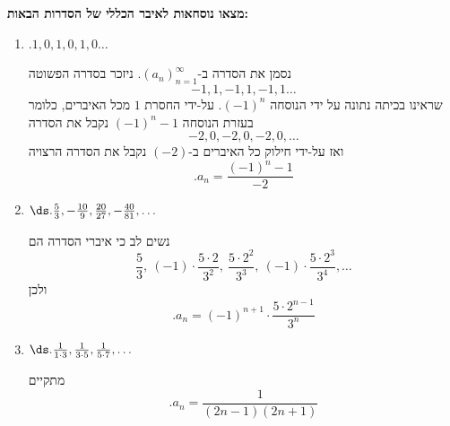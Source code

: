 \textbf{מצאו נוסחאות לאיבר הכללי של הסדרות הבאות:}
\begin{enumerate}
\item $.1,0,1,0,1,0\ldots$
\begin{solbox}
נסמן את הסדרה ב-$(a_n)_{n=1}^{\infty}$.
ניזכר בסדרה הפשוטה
$$-1,1,-1,1,-1,1\ldots$$
שראינו בכיתה נתונה על ידי הנוסחה
$(-1)^n$.
על-ידי החסרת
$1$
מכל האיברים, כלומר בעזרת הנוסחה
$(-1)^n-1$
נקבל את הסדרה
$$-2,0,-2,0,-2,0,\ldots$$
ואז על-ידי חילוק כל האיברים ב-$(-2)$
נקבל את הסדרה הרצויה
$$.a_n=\frac{(-1)^n-1}{-2}$$
\end{solbox}
\item $\ds .\frac53,-\frac{10}{9},\frac{20}{27},-\frac{40}{81},\ldots$
\begin{solbox}
נשים לב כי איברי הסדרה הם
$$\frac53,\ (-1)\cdot\frac{5\cdot2}{3^2},\ \frac{5\cdot2^2}{3^3},\ (-1)\cdot\frac{5\cdot2^3}{3^4},\ldots$$
ולכן
$$.a_n=(-1)^{n+1}\cdot\frac{5\cdot2^{n-1}}{3^n}$$
\end{solbox}
\item $\ds .\frac{1}{1\cdot3},\frac{1}{3\cdot5},\frac{1}{5\cdot7},\ldots$
\begin{solbox}
מתקיים
$$.a_n=\frac{1}{(2n-1)(2n+1)}$$
\end{solbox}
\eMs
\end{enumerate}
